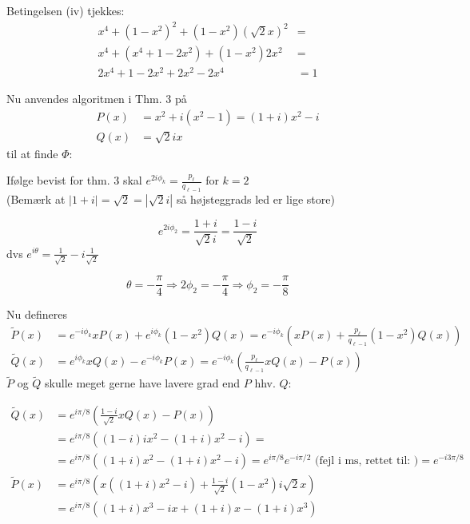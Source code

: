\documentclass[11pt,a4paper]{article}
\begin{document}
Betingelsen (iv) tjekkes:
\begin{align*}
    x^4 + (1 - x^2)^2 + (1 - x^2)(\sqrt{2}x)^2 &= \\
    x^4 + (x^4 + 1 - 2x^2) + (1 - x^2)2x^2 &= \\
    2x^4 + 1 - 2x^2 + 2x^2 - 2x^4 &= 1
\end{align*}

\newpage

Nu anvendes algoritmen i Thm. 3 på
\begin{align*}
    P(x) &= x^2 + i(x^2 - 1) = (1+i)x^2 - i \\
    Q(x) &= \sqrt{2}ix
\end{align*}
til at finde $\Phi$:

Ifølge bevist for thm. 3 skal $e^{2i\phi_k} = \frac{p_\ell}{q_{\ell-1}}$ for $k=2$ \\
(Bemærk at $|1+i| = \sqrt{2} = |\sqrt{2}i|$ så højsteggrads led er lige store)

\[ e^{2i\phi_2} = \frac{1+i}{\sqrt{2}i} = \frac{1-i}{\sqrt{2}} \]
dvs $e^{i\theta} = \frac{1}{\sqrt{2}} - i \frac{1}{\sqrt{2}}$

\begin{center}
\end{center}

\[ \theta = -\frac{\pi}{4} \Rightarrow 2\phi_2 = -\frac{\pi}{4} \Rightarrow \phi_2 = -\frac{\pi}{8} \]

Nu defineres
\begin{align*}
    \tilde{P}(x) &= e^{-i\phi_k} x P(x) + e^{i\phi_k}(1-x^2)Q(x) = e^{-i\phi_k}\left( x P(x) + \frac{p_\ell}{q_{\ell-1}}(1-x^2)Q(x) \right) \\
    \tilde{Q}(x) &= e^{i\phi_k} x Q(x) - e^{-i\phi_k} P(x) = e^{-i\phi_k} \left( \frac{p_\ell}{q_{\ell-1}} x Q(x) - P(x) \right)
\end{align*}
$\tilde{P}$ og $\tilde{Q}$ skulle meget gerne have lavere grad end $P$ hhv. $Q$:

\begin{align*}
    \tilde{Q}(x) &= e^{i\pi/8} \left( \frac{1-i}{\sqrt{2}} x Q(x) - P(x) \right) \\
    &= e^{i\pi/8} \left( (1-i)i x^2 - (1+i)x^2 - i \right) = \\
    &= e^{i\pi/8} \left( (1+i)x^2 - (1+i)x^2 - i \right) = e^{i\pi/8} e^{-i\pi/2} \text{ (fejl i ms, rettet til: )} = e^{-i3\pi/8} \\
    \tilde{P}(x) &= e^{i\pi/8} \left( x((1+i)x^2 - i) + \frac{1-i}{\sqrt{2}}(1-x^2)i\sqrt{2}x \right) \\
    &= e^{i\pi/8} \left( (1+i)x^3 - ix + (1+i)x - (1+i)x^3 \right)
\end{align*}
\end{document}
